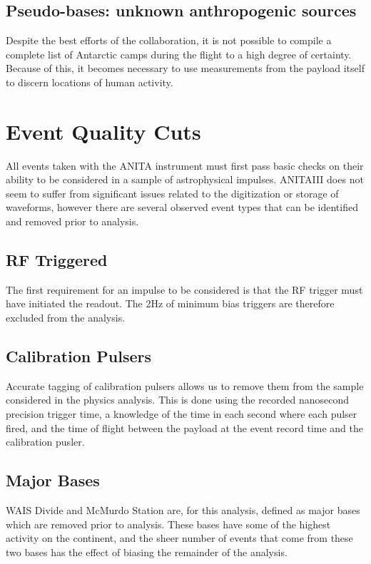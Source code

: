 	\subsection{Pseudo-bases: unknown anthropogenic sources}
		Despite the best efforts of the collaboration, it is not possible to compile a complete list of Antarctic camps during the flight to a high degree of certainty.  Because of this, it becomes necessary to use measurements from the payload itself to discern locations of human activity.  


	
\section{Event Quality Cuts}%
	All events taken with the ANITA instrument must first pass basic checks on their ability to be considered in a sample of astrophysical impulses.  ANITAIII does not seem to suffer from significant issues related to the digitization or storage of waveforms, however there are several observed event types that can be identified and removed prior to analysis.

	\subsection{RF Triggered}
		The first requirement for an impulse to be considered is that the RF trigger must have initiated the readout.  The 2Hz of minimum bias triggers are therefore excluded from the analysis.

	\subsection{Calibration Pulsers}
		Accurate tagging of calibration pulsers allows us to remove them from the sample considered in the physics analysis.  This is done using the recorded nanosecond precision trigger time, a knowledge of the time in each second where each pulser fired, and the time of flight between the payload at the event record time and the calibration pusler.
		
	\subsection{Major Bases}
		WAIS Divide and McMurdo Station are, for this analysis, defined as major bases which are removed prior to analysis.  These bases have some of the highest activity on the continent, and the sheer number of events that come from these two bases has the effect of biasing the remainder of the analysis.

